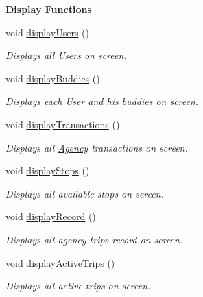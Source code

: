 \begin{Indent}\textbf{ Display Functions}\par
\begin{DoxyCompactItemize}
\item 
void \hyperlink{group___agency_ga485882deafb4fc8d075c9cb096ebd35c}{display\+Users} ()
\begin{DoxyCompactList}\small\item\em Displays all Users on screen. \end{DoxyCompactList}\item 
void \hyperlink{group___agency_ga319cf67aaea58bc778455283a18fd2c0}{display\+Buddies} ()
\begin{DoxyCompactList}\small\item\em Displays each \hyperlink{class_user}{User} and his buddies on screen. \end{DoxyCompactList}\item 
void \hyperlink{group___agency_gad3c880c51f35459cf189ffc4a43203ba}{display\+Transactions} ()
\begin{DoxyCompactList}\small\item\em Displays all \hyperlink{class_agency}{Agency} transactions on screen. \end{DoxyCompactList}\item 
void \hyperlink{group___agency_gaae86bb356ef4c2f1232d33408e5a3a22}{display\+Stops} ()
\begin{DoxyCompactList}\small\item\em Displays all available stops on screen. \end{DoxyCompactList}\item 
void \hyperlink{group___agency_gabae4f41bfdd7c7965701afe34ad5aec4}{display\+Record} ()
\begin{DoxyCompactList}\small\item\em Displays all agency trips record on screen. \end{DoxyCompactList}\item 
void \hyperlink{group___agency_ga3ce9f0643c267083baa3145ddbfd72a4}{display\+Active\+Trips} ()
\begin{DoxyCompactList}\small\item\em Displays all active trips on screen. \end{DoxyCompactList}\end{DoxyCompactItemize}
\end{Indent}
